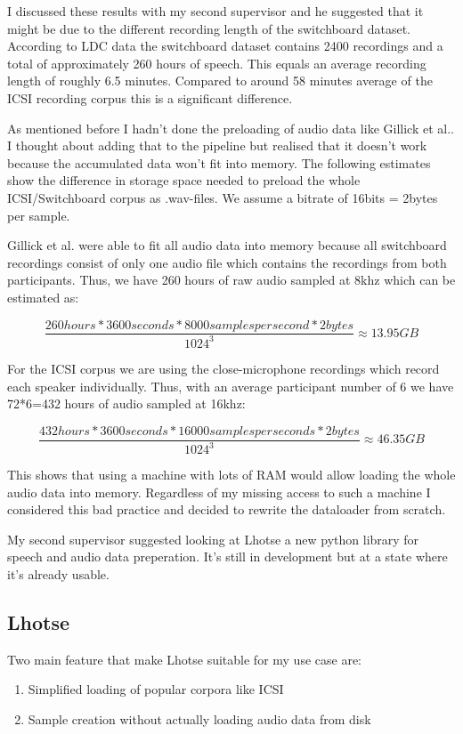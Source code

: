 \documentclass[bsc,frontabs,parskip,deptreport]{infthesis}
\begin{document}
I discussed these results with my second supervisor and he suggested that it might be due to the different recording length of the switchboard dataset. According to LDC data \citep{switchboard-ldc} the switchboard dataset contains 2400 recordings and a total of approximately 260 hours of speech. This equals an average recording length of roughly 6.5 minutes. Compared to around 58 minutes average \citep{icsi-ldc} of the ICSI recording corpus this is a significant difference.


As mentioned before I hadn't done the preloading of audio data like Gillick et al.. 
I thought about adding that to the pipeline but realised that it doesn't work because the accumulated data won't fit into memory. 
The following estimates show the difference in storage space needed to preload the whole ICSI/Switchboard corpus as .wav-files. We assume a bitrate of 16bits = 2bytes per sample.

Gillick et al. were able to fit all audio data into memory because all switchboard recordings consist of only one audio file which contains the recordings from both participants. Thus, we have 260 hours of raw audio sampled at 8khz which can be estimated as:

\[ \frac{260hours * 3600 seconds * 8000 samples per second * 2 bytes}{1024^3} \approx 13.95 GB \]

For the ICSI corpus we are using the close-microphone recordings which record each speaker individually. Thus, with an average participant number of 6 we have 72*6=432 hours of audio sampled at 16khz:

\[ \frac{432 hours * 3600 seconds * 16000 samples per seconds * 2bytes}{1024^3} \approx 46.35 GB \]

This shows that using a machine with lots of RAM would allow loading the whole audio data into memory. 
Regardless of my missing access to such a machine I considered this bad practice and decided to rewrite the dataloader from scratch. 

My second supervisor suggested looking at Lhotse \citep{zelasko2021lhotse} a new python library for speech and audio data preperation. It's still in development but at a state where it's already usable.

\subsection{Lhotse}
Two main feature that make Lhotse suitable for my use case are:
\begin{enumerate}
    \item Simplified loading of popular corpora like ICSI
    \item Sample creation without actually loading audio data from disk
\end{enumerate}
\end{document}
